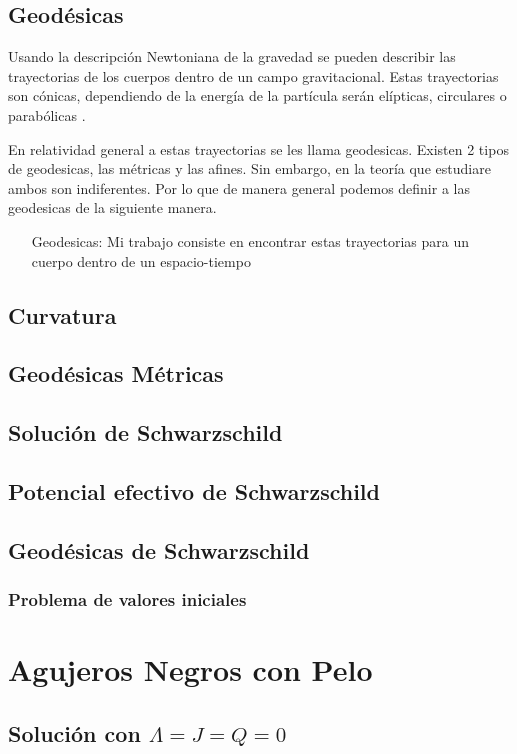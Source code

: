 \documentclass[../Main.tex]{subfiles}
\begin{document}
\subsection{Geodésicas}
Usando la descripción Newtoniana de la gravedad se pueden describir las trayectorias de los cuerpos dentro de un campo gravitacional. Estas trayectorias son cónicas, dependiendo de la energía de la partícula serán elípticas, circulares o parabólicas \cite{Landau1976Mechanics}.

En relatividad general a estas trayectorias se les llama geodesicas. Existen 2 tipos de geodesicas, las métricas y las afines. Sin embargo, en la teoría que estudiare ambos son indiferentes. Por lo que de manera general podemos definir a las geodesicas de la siguiente manera.
\begin{itemize}
    \item[Geodesicas:]   
Mi trabajo consiste en encontrar estas trayectorias para un cuerpo dentro de un espacio-tiempo
\end{itemize}

\subsection{Curvatura}
\subsection{Geodésicas Métricas}
\subsection{Solución de Schwarzschild}
\subsection{Potencial efectivo de Schwarzschild}
\subsection{Geodésicas de Schwarzschild}
\subsubsection{Problema de valores iniciales}
\section{Agujeros Negros con Pelo}
\subsection{Solución con $\Lambda=J=Q=0$}
\end{document}
